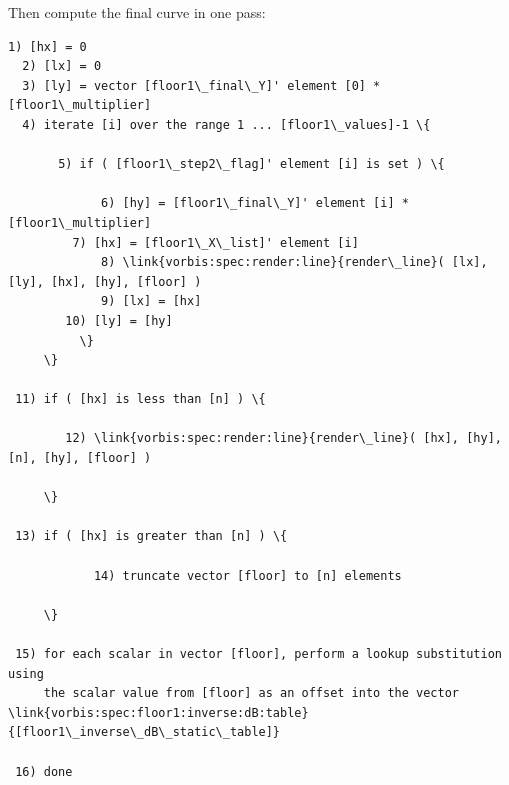 \begin{description}
Then compute the final curve in one pass:

\begin{Verbatim}[commandchars=\\\{\}]
  1) [hx] = 0
  2) [lx] = 0
  3) [ly] = vector [floor1\_final\_Y]' element [0] * [floor1\_multiplier]
  4) iterate [i] over the range 1 ... [floor1\_values]-1 \{

       5) if ( [floor1\_step2\_flag]' element [i] is set ) \{

             6) [hy] = [floor1\_final\_Y]' element [i] * [floor1\_multiplier]
 	     7) [hx] = [floor1\_X\_list]' element [i]
             8) \link{vorbis:spec:render:line}{render\_line}( [lx], [ly], [hx], [hy], [floor] )
             9) [lx] = [hx]
	    10) [ly] = [hy]
          \}
     \}

 11) if ( [hx] is less than [n] ) \{

        12) \link{vorbis:spec:render:line}{render\_line}( [hx], [hy], [n], [hy], [floor] )

     \}

 13) if ( [hx] is greater than [n] ) \{

            14) truncate vector [floor] to [n] elements

     \}

 15) for each scalar in vector [floor], perform a lookup substitution using
     the scalar value from [floor] as an offset into the vector \link{vorbis:spec:floor1:inverse:dB:table}{[floor1\_inverse\_dB\_static\_table]}

 16) done

\end{Verbatim}

\end{description}
